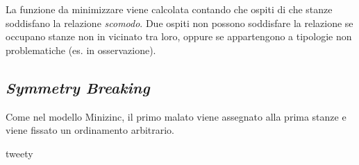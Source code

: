\noindent
La funzione da minimizzare viene calcolata contando che ospiti di che stanze soddisfano la relazione \emph{scomodo}.
Due ospiti non possono soddisfare la relazione se occupano stanze non in vicinato tra loro, oppure se appartengono a tipologie non problematiche (es. in osservazione).


\subsection{\emph{Symmetry Breaking}}
Come nel modello Minizinc, il primo malato viene assegnato alla prima stanze e viene fissato un ordinamento arbitrario.


tweety
